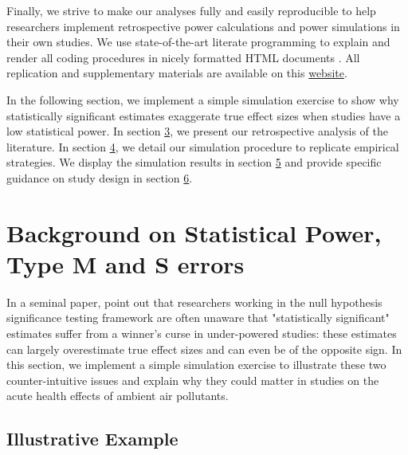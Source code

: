 \documentclass[12pt]{article}
\begin{document}
    Finally, we strive to make our analyses fully and easily reproducible to help researchers implement retrospective power calculations and power simulations in their own studies. We use state-of-the-art literate programming to explain and render all coding procedures in nicely formatted HTML documents \citep{allaire2018distill}. All replication and supplementary materials are available on this \href{https://vincentbagilet.github.io/inference_pollution/}{website}.
     
    In the following section, we implement a simple simulation exercise to show why statistically significant estimates exaggerate true effect sizes when studies have a low statistical power. In section \hyperlink{section.3}{3}, we present our retrospective analysis of the literature. In section \hyperlink{section.4}{4}, we detail our simulation procedure to replicate empirical strategies. We display the simulation results in section \hyperlink{section.5}{5} and provide specific guidance on study design in section \hyperlink{section.6}{6}.
    




\section{Background on Statistical Power, Type M and S errors}

    In a seminal paper, \cite{gelman_beyond_2014} point out that researchers working in the null hypothesis significance testing framework are often unaware that "statistically significant" estimates suffer from a winner's curse in under-powered studies: these estimates can largely overestimate true effect sizes and can even be of the opposite sign. In this section, we implement a simple simulation exercise to illustrate these two counter-intuitive issues and explain why they could matter in studies on the acute health effects of ambient air pollutants.

    \subsection{Illustrative Example}
\end{document}
